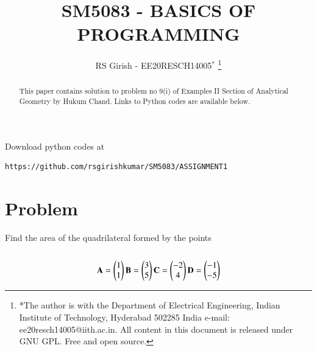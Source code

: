\documentclass[journal,12pt,twocolumn]{IEEEtran}
\begin{document}
\makeatletter
{}
\makeatother
\let\StandardTheFigure\thefigure
\let\vec\mathbf
\renewcommand{\thefigure}{\theproblem}
\def\putbox#1#2#3{\makebox[0in][l]{\makebox[#1][l]{}\raisebox{\baselineskip}[0in][0in]{\raisebox{#2}[0in][0in]{#3}}}}
     \def\rightbox#1{\makebox[0in][r]{#1}}
     \def\centbox#1{\makebox[0in]{#1}}
     \def\topbox#1{\raisebox{-\baselineskip}[0in][0in]{#1}}
     \def\midbox#1{\raisebox{-0.5\baselineskip}[0in][0in]{#1}}
\vspace{3cm}
\title{
SM5083 - BASICS OF PROGRAMMING
	}
\author{ RS Girish - EE20RESCH14005$^{*}$%
\thanks{*The author is with the Department
		of Electrical Engineering, Indian Institute of Technology, Hyderabad
		502285 India e-mail:  ee20resch14005@iith.ac.in. All content in this document is released under GNU GPL.  Free and open source.}
	}	

\maketitle
\newpage
\tableofcontents
\bigskip
\renewcommand{\thefigure}{\theenumi}
\renewcommand{\thetable}{\theenumi}

\begin{abstract}
This paper contains solution to problem no 9(i) of Examples II Section of Analytical Geometry by Hukum Chand.
Links to Python codes are available below.  
\end{abstract}
Download python codes at 
\begin{lstlisting}
https://github.com/rsgirishkumar/SM5083/ASSIGNMENT1
\end{lstlisting}
\section{Problem}
Find the area of the quadrilateral formed by the points\\
\\
\begin{align}
\vec{A} = \myvec{1 \\ 1}
\vec{B} = \myvec{3 \\ 5}
\vec{C} = \myvec{-2 \\ 4}
\vec{D} = \myvec{-1 \\ -5}
\end{align}
\end{document}
